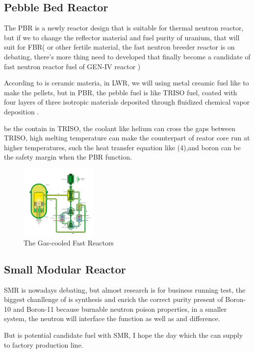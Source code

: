 \documentclass[final,10pt,times,twocolumn]{elsarticle}
\begin{document}
\subsection{Pebble Bed Reactor}
The PBR is a newly reactor design that is suitable for thermal neutron reactor, but if we to change the reflector material and fuel purity of uranium, that will suit for FBR( or other fertile material, the fast neutron breeder reactor is on debating, there's more thing need to developed that finally become a candidate of fast neutron reactor fuel of GEN-IV reactor )

According to  is ceramic materia, in LWR, we will using metal creamic fuel like  to make the pellets, but in PBR, the pebble fuel is like TRISO fuel, coated with four layers of three isotropic materials deposited through fluidized chemical vapor deposition \cite{unknown}. 

 be the contain in TRISO, the coolant like helium can cross the gaps between TRISO,  high melting temperature can make the counterpart of reator core run at higher temperatures, such the heat transfer equation like (4),and boron can be the safety margin when the PBR function.

\begin{figure}[h]
    \centering
    \includegraphics[width = 3.75cm]{gas-cooled.png}
    \caption{The Gas-cooled Fast Reactors \cite{unknown} }
\end{figure}

\subsection{Small Modular Reactor}
SMR is nowadays debating, but almost research is for business running test, the biggest chanllenge of  is synthesis and enrich the correct purity present of Boron-10 and Boron-11 because burnable neutron poison properties, in a smaller system, the neutron will interface the function as well as  and  difference.

But  is potential candidate fuel with SMR, I hope the day which the  can supply to factory production line.
\end{document}

